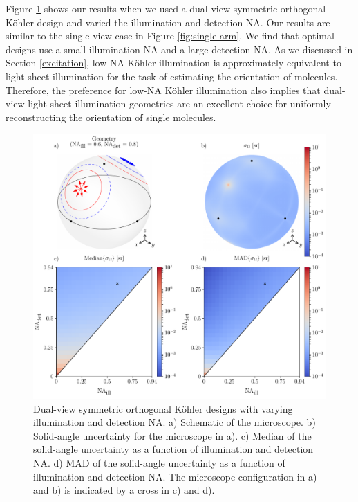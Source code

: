 \documentclass[10pt]{article}
\begin{document}
Figure \ref{fig:double-arm} shows our results when we used a dual-view symmetric
orthogonal K\"ohler design and varied the illumination and detection NA. Our
results are similar to the single-view case in Figure \ref{fig:single-arm}. We
find that optimal designs use a small illumination NA and a large detection
NA. As we discussed in Section \ref{excitation}, low-NA K\"ohler illumination is
approximately equivalent to light-sheet illumination for the task of estimating
the orientation of molecules. Therefore, the preference for low-NA K\"ohler
illumination also implies that dual-view light-sheet illumination geometries are
an excellent choice for uniformly reconstructing the orientation of single
molecules.

\begin{figure}[htbp]
\centering\includegraphics[width=\textwidth]{double-arm}
\caption{Dual-view symmetric orthogonal K\"ohler designs with varying
  illumination and detection NA. a) Schematic of the microscope. b) Solid-angle
  uncertainty for the microscope in a). c) Median of the solid-angle uncertainty
  as a function of illumination and detection NA. d) MAD of the solid-angle
  uncertainty as a function of illumination and detection NA. The microscope
  configuration in a) and b) is indicated by a cross in c) and d).}
\label{fig:double-arm}
\end{figure}
\end{document}
